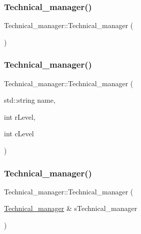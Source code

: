 \subsubsection{\texorpdfstring{Technical\+\_\+manager()}{Technical\_manager()}\hspace{0.1cm}{\footnotesize\ttfamily [1/4]}}
{\footnotesize\ttfamily Technical\+\_\+manager\+::\+Technical\+\_\+manager (\begin{DoxyParamCaption}{ }\end{DoxyParamCaption})}

\hypertarget{class_technical__manager_a244f241464f3904b738af855d513dc2c}{}\label{class_technical__manager_a244f241464f3904b738af855d513dc2c} 
\subsubsection{\texorpdfstring{Technical\+\_\+manager()}{Technical\_manager()}\hspace{0.1cm}{\footnotesize\ttfamily [2/4]}}
{\footnotesize\ttfamily Technical\+\_\+manager\+::\+Technical\+\_\+manager (\begin{DoxyParamCaption}\item[{std\+::string}]{name,  }\item[{int}]{r\+Level,  }\item[{int}]{c\+Level }\end{DoxyParamCaption})}

\hypertarget{class_technical__manager_a9cc85e5534ba09b7fd7cb5c9de3996af}{}\label{class_technical__manager_a9cc85e5534ba09b7fd7cb5c9de3996af} 
\subsubsection{\texorpdfstring{Technical\+\_\+manager()}{Technical\_manager()}\hspace{0.1cm}{\footnotesize\ttfamily [3/4]}}
{\footnotesize\ttfamily Technical\+\_\+manager\+::\+Technical\+\_\+manager (\begin{DoxyParamCaption}\item[{\hyperlink{class_technical__manager}{Technical\+\_\+manager} \&}]{s\+Technical\+\_\+manager }\end{DoxyParamCaption})}

